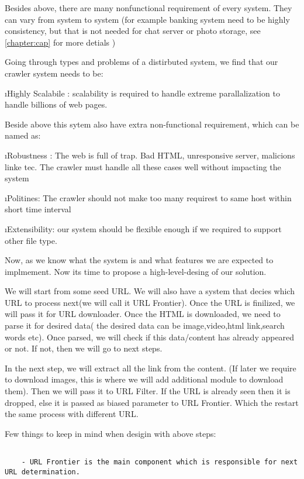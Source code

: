 Besides above, there are many nonfunctional requirement of every system. They can vary from system to system (for example banking system need to be highly consistency, but that is not needed for chat server or photo storage, see \ref{chapter:cap} for more detials )

Going through types and problems of a distirbuted system, we find that our crawler system needs to be:

\ls
\i Highly Scalabile : scalability is required to handle extreme parallalization to handle billions of web pages.

Beside above this sytem also have extra non-functional requirement, which can be named as:

\i Robustness : The web is full of trap. Bad HTML, unresponsive server, malicions linke tec. The crawler must handle all these cases well without impacting the system

\i Politines: The crawler should not make too many requirest to same host within short time interval

\i Extensibility: our system should be flexible enough if we required to support other file type.
\le


Now, as we know what the system is and what features we are expected to implmement. Now its time to propose a high-level-desing of our solution.

We will start from some seed URL. We will also have a system that decies which URL to process next(we will call it URL Frontier). Once the URL is finilized, we will pass it for URL downloader. Once the HTML is downloaded, we need to parse it for desired data( the desired data can be image,video,html link,search words etc). Once parsed, we will check if this data/content has already appeared or not. If not, then we will go to next steps.

In the next step, we will extract all the link from the content. (If later we require to download images, this is where we will add additional module to download them). Then we will pass it to URL Filter. If the URL is already seen then it is dropped, else it is passed as biased parameter to URL Frontier. Which the restart the same process with different URL. 

Few things to keep in mind when desigin with above steps:
\begin{lstlisting}

    - URL Frontier is the main component which is responsible for next URL determination.
\end{lstlisting}